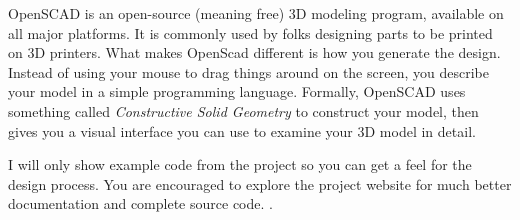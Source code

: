 OpenSCAD is an open-source (meaning free) 3D modeling program, available on all
major platforms. It is commonly used by folks designing parts to be printed on
3D printers. What makes OpenScad different is how you generate the design.
Instead of using your mouse to drag things around on the screen, you describe
your model in a simple programming language. Formally, OpenSCAD uses something
called {\it Constructive Solid Geometry} to construct your model, then gives
you a visual interface you can use to examine your 3D model in detail.

I will only show example code from the project so you can get a feel for the
design process. You are encouraged to explore the project website for much
better documentation and complete source code. \cite{blackr}.

